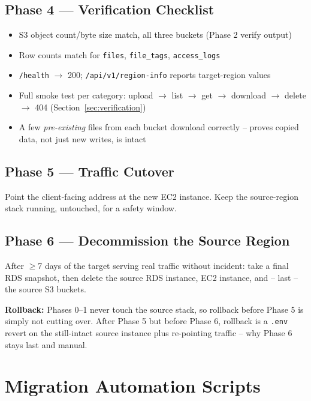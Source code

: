 \documentclass[10pt]{article}
\begin{document}
\subsection{Phase 4 --- Verification Checklist}
\begin{itemize}[label=$\square$]
  \item S3 object count/byte size match, all three buckets (Phase 2 verify output)
  \item Row counts match for \texttt{files}, \texttt{file\_tags}, \texttt{access\_logs}
  \item \texttt{/health} $\to$ 200; \texttt{/api/v1/region-info} reports target-region values
  \item Full smoke test per category: upload $\to$ list $\to$ get $\to$ download $\to$ delete $\to$ 404 (Section~\ref{sec:verification})
  \item A few \emph{pre-existing} files from each bucket download correctly -- proves copied data, not just new writes, is intact
\end{itemize}

\subsection{Phase 5 --- Traffic Cutover}
Point the client-facing address at the new EC2 instance. Keep the
source-region stack running, untouched, for a safety window.

\subsection{Phase 6 --- Decommission the Source Region}
After $\ge$7 days of the target serving real traffic without incident: take
a final RDS snapshot, then delete the source RDS instance, EC2 instance,
and -- last -- the source S3 buckets.

\begin{tipbox}
\textbf{Rollback:} Phases 0--1 never touch the source stack, so rollback
before Phase 5 is simply not cutting over. After Phase 5 but before Phase 6,
rollback is a \texttt{.env} revert on the still-intact source instance plus
re-pointing traffic -- why Phase 6 stays last and manual.
\end{tipbox}

\section{Migration Automation Scripts}
\label{sec:scripts}
\end{document}
